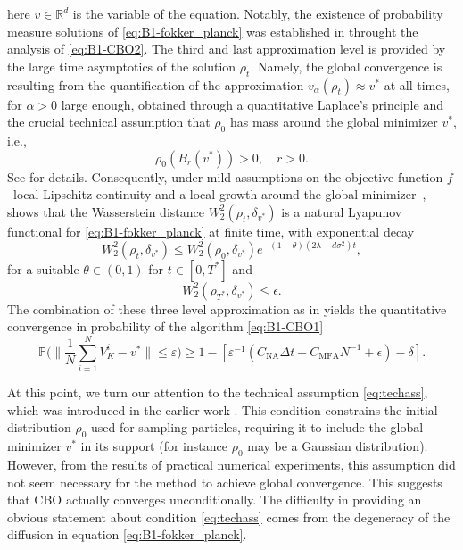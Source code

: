 \documentclass[a4paper, 11pt]{article}
\newcounter{results}[section]
\theoremstyle{plain}
\theoremstyle{remark}
\theoremstyle{definition}
\begin{document}
{here $v\in\mathbb{R}^d$ is the variable of the equation.} Notably, the existence of probability measure solutions of \eqref{eq:B1-fokker_planck} was established in \cite{carrillo2018analytical} throught the analysis of \eqref{eq:B1-CBO2}. 
The third and last approximation level is provided by the large time asymptotics of the solution $\rho_t$. Namely, the global convergence is resulting from the quantification of the approximation $v_\alpha(\rho_t) \approx v^*$ at all times, for $\alpha>0$ large enough, obtained  through a quantitative Laplace's principle \cite[Proposition 4.5]{B1-fornasier2021global} and the crucial technical assumption that $\rho_0$ has mass around 
the global minimizer $v^*$, i.e.,
\begin{equation}\label{eq:techass}
\rho_0(B_r(v^*)) >0, \quad r>0.
\end{equation}
See \cite[Proposition 4.6]{B1-fornasier2021global} for details.
Consequently, under mild assumptions on the objective function $f$ --local Lipschitz continuity and a local growth around the global minimizer--, \cite[Theorem 3.7]{B1-fornasier2021global} shows that the Wasserstein distance $W_2^2(\rho_t, \delta_{v^*})$ is a natural Lyapunov functional for \eqref{eq:B1-fokker_planck} at finite time, with exponential decay
\begin{equation}\label{eq:contr}
W_2^2(\rho_t, \delta_{v^*}) \leq W_2^2(\rho_0, \delta_{v^*}) e^{-(1-\theta)(2\lambda - d \sigma^2) t}, 
\end{equation}
for a suitable $\theta \in (0,1)$ for $t \in [0,T^*]$ and 
\begin{equation}\label{eq:finerr}
    W_2^2(\rho_{T^*}, \delta_{v^*}) \leq \epsilon.
\end{equation}
The combination of these three level approximation as in \cite[Theorem 3.8]{B1-fornasier2021global} yields the quantitative convergence in probability of the algorithm \eqref{eq:B1-CBO1}
\begin{equation}\label{B1-ownresult2}
  \mathbb P\Bigg( \|\frac{1}{N} \sum_{i=1}^N V_{K}^i-v^*\| \leq \varepsilon\Bigg) \geq 1 - \left [ \varepsilon^{-1} (C_{\mathrm{NA}}\Delta t+C_{\mathrm{MFA}} N^{-1}+\epsilon) -\delta \right ].
\end{equation}

At this point, we turn our attention to the technical assumption \eqref{eq:techass}, which was introduced in the earlier work \cite{carrillo2018analytical,B1-fornasier2021global}. This condition constrains the initial distribution \(\rho_0\) used for sampling particles, requiring it to include the global minimizer \(v^*\) in its support (for instance $\rho_0$ may be a Gaussian distribution). However, from the results of practical numerical experiments, this assumption did not seem necessary for the method to achieve global convergence. This suggests that CBO actually converges { unconditionally}.
The difficulty in providing an obvious statement about condition \eqref{eq:techass} comes from the degeneracy of the diffusion in equation \eqref{eq:B1-fokker_planck}. 
\\
\end{document}
